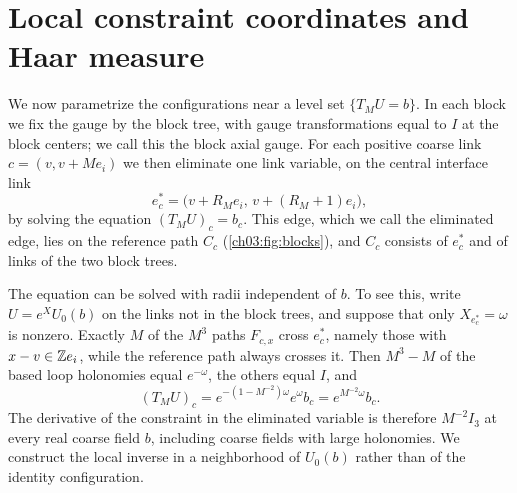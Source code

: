 \section{Local constraint coordinates and Haar measure}\label{ch03:sec:coordinates}

We now parametrize the configurations near a level set $\{T_MU=b\}$. In each block we fix the gauge by the block tree, with gauge transformations equal to $I$ at the block centers; we call this the block axial gauge. For each positive coarse link $c=(v,v+Me_i)$ we then eliminate one link variable, on the central interface link
\[
 e^*_c=\bigl(v+R_Me_i,\,v+(R_M+1)e_i\bigr),
\]
by solving the equation $(T_MU)_c=b_c$. This edge, which we call the eliminated edge, lies on the reference path $C_c$ (\cref{ch03:fig:blocks}), and $C_c$ consists of $e^*_c$ and of links of the two block trees.

The equation can be solved with radii independent of $b$. To see this, write $U=e^XU_0(b)$ on the links not in the block trees, and suppose that only $X_{e^*_c}=\omega$ is nonzero. Exactly $M$ of the $M^3$ paths $F_{c,x}$ cross $e^*_c$, namely those with $x-v\in\mathbb Z e_i$, while the reference path always crosses it. Then $M^3-M$ of the based loop holonomies equal $e^{-\omega}$, the others equal $I$, and
\[
 (T_MU)_c=e^{-(1-M^{-2})\omega}e^\omega b_c=e^{M^{-2}\omega}b_c.
\]
The derivative of the constraint in the eliminated variable is therefore $M^{-2}I_3$ at every real coarse field $b$, including coarse fields with large holonomies. We construct the local inverse in a neighborhood of $U_0(b)$ rather than of the identity configuration.

